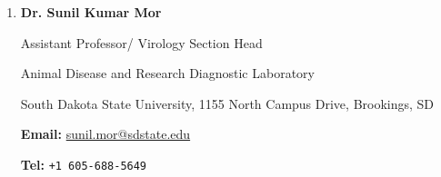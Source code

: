 \begin{enumerate}
\item \textbf{Dr.{} Sunil Kumar Mor  }\par 
Assistant Professor/ Virology Section Head \par
Animal Disease and Research Diagnostic Laboratory \par
South Dakota State University, 1155 North Campus Drive, Brookings, SD\par
\textbf{Email:} \url{sunil.mor@sdstate.edu }\par
\textbf{Tel:} {\texttt{+1 605-{}688-{}5649}}





\end{enumerate}